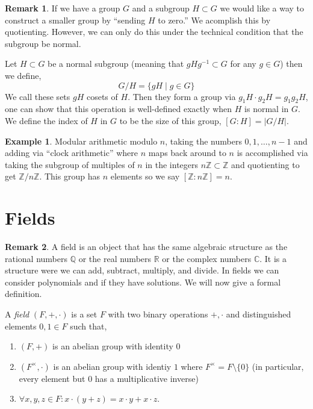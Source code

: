 \documentclass{article}
\newcommand{\Z}{\mathbb{Z}}
\newcommand{\R}{\mathbb{R}}
\newcommand{\Q}{\mathbb{Q}}
\newcommand{\C}{\mathbb{C}}
\theoremstyle{definition}
\newtheorem{example}[theorem]{Example}
\newtheorem{remark}{Remark}[section]
\newenvironment{definition}[1][Definition:]{\begin{trivlist}
\item[\hskip \labelsep {\bfseries #1}]}{\end{trivlist}}
\begin{document}
\begin{remark}
If we have a group $G$ and a subgroup $H \subset G$ we would like a way to construct a  smaller group by ``sending $H$ to zero.'' We acomplish this by quotienting. However, we can only do this under the technical condition that the subgroup be normal.
\end{remark}

\begin{definition}
Let $H \subset G$ be a normal subgroup (meaning that $g H g^{-1} \subset G$ for any $g \in G$) then we define,
\[ G / H = \{ g H \mid g \in G \} \]
We call these sets $g H$ cosets of $H$. Then they form a group via $g_1 H \cdot g_2 H = g_1 g_2 H$, one can show that this operation is well-defined exactly when $H$ is normal in $G$. We define the index of $H$ in $G$ to be the size of this group, $[G : H] = |G / H|$.
\end{definition}

\begin{example}
Modular arithmetic modulo $n$, taking the numbers $0, 1, \dots, n-1$ and adding via ``clock arithmetic'' where $n$ maps back around to $n$ is accomplished via taking the subgroup of multiples of $n$ in the integers $n \Z \subset \Z$ and quotienting to get $\Z / n \Z$. This group has $n$ elements so we say $[\Z : n \Z] = n$. 
\end{example}

\section{Fields}

\begin{remark}
A field is an object that has the same algebraic structure as the rational numbers $\Q$ or the real numbers $\R$ or the complex numbers $\C$. It is a structure were we can add, subtract, multiply, and divide. In fields we can consider polynomials and if they have solutions. We will now give a formal definition.
\end{remark}

\begin{definition}
A \textit{field} $(F, +, \cdot)$ is a set $F$ with two binary operations $+, \cdot$ and distinguished elements $0,1 \in F$ such that,
\begin{enumerate}
\item $(F, +)$ is an abelian group with identity $0$
\item $(F^\times, \cdot)$ is an abelian group with identiy $1$ where $F^\times = F \setminus \{ 0 \}$ (in particular, every element but $0$ has a multiplicative inverse)
\item $\forall x, y, z \in F : x \cdot (y + z) = x \cdot y + x \cdot z$.
\end{enumerate}
\end{definition}
\end{document}
